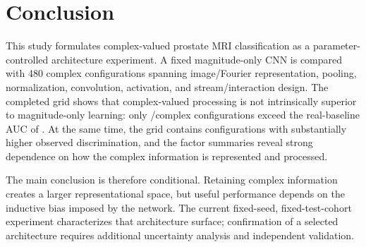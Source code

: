 \section{Conclusion}\label{sec:conclusion}
This study formulates complex-valued prostate MRI classification as a parameter-controlled architecture experiment. A fixed magnitude-only CNN is compared with 480 complex configurations spanning image/Fourier representation, pooling, normalization, convolution, activation, and stream/interaction design. The completed grid shows that complex-valued processing is not intrinsically superior to magnitude-only learning: only \ComplexWins/\ComplexTotal complex configurations exceed the real-baseline AUC of \RealAUC. At the same time, the grid contains configurations with substantially higher observed discrimination, and the factor summaries reveal strong dependence on how the complex information is represented and processed.

The main conclusion is therefore conditional. Retaining complex information creates a larger representational space, but useful performance depends on the inductive bias imposed by the network. The current fixed-seed, fixed-test-cohort experiment characterizes that architecture surface; confirmation of a selected architecture requires additional uncertainty analysis and independent validation.
